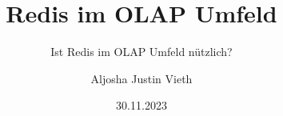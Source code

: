 \documentclass{hfubook} %
\begin{document}
\author{Aljosha Justin Vieth}
\title{Redis im OLAP Umfeld}
\subtitle{Ist Redis im OLAP Umfeld nützlich?}     %
\date{30.11.2023}

\maketitle

\frontmatter
{}

\tableofcontents                        %
\listoffigures                          %
\listoftables                           %
\lstlistoflistings                      %
\abbrtitle

\mainmatter







\begin{singlespace}
    \printbibliography
\end{singlespace}

\eidesstattlicheerkaerung

\appendix

\begin{appendices}
    
    
\end{appendices}
\end{document}
